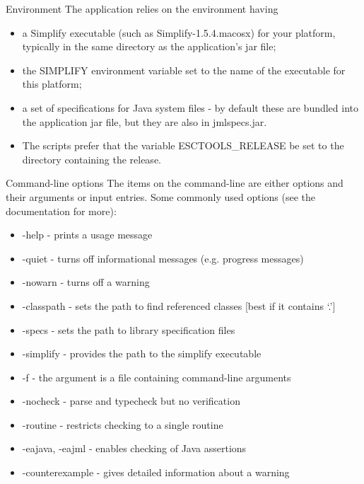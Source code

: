 \documentclass[
pdf,
nocolorBG,
slideColor,
cok,
]{prosper}
\begin{document}
\begin{slide}{Environment}
\vspace*{-6ex}
The application relies on the environment having 
\begin{itemize}
\item a Simplify executable (such as Simplify-1.5.4.macosx) for your platform, typically in the same directory as the application's jar file;
\item the {\blue SIMPLIFY} environment variable set to the name of the executable for this platform;
\item a set of specifications for Java system files - by default these are bundled into the application jar file, but they are also in {\blue jmlspecs.jar}.
\item The scripts prefer that the variable {\blue ESCTOOLS\_RELEASE} be set to the directory containing the release.
\end{itemize}
\end{slide}


\begin{slide}{Command-line options}
\vspace*{-9ex}
The items on the command-line are either options and their arguments or input entries.
Some commonly used options (see the documentation for more):
\tiny
\begin{itemize}
\item {\knalblue -help} - prints a usage message
\item {\knalblue -quiet} - turns off informational messages (e.g. progress messages)
\item {\knalblue -nowarn} - turns off a warning
\item {\knalblue -classpath} - sets the path to find referenced classes [best if it contains `.']
\item {\knalblue -specs} - sets the path to library specification files
\item {\knalblue -simplify} - provides the path to the simplify executable
\item {\knalblue -f} - the argument is a file containing command-line arguments
\item {\knalblue -nocheck} - parse and typecheck but no verification
\item {\knalblue -routine} - restricts checking to a single routine
\item {\knalblue -eajava}, {\knalblue -eajml} - enables checking of Java assertions
\item {\knalblue -counterexample} - gives detailed information about a warning
\end{itemize}
\end{slide}
\end{document}
